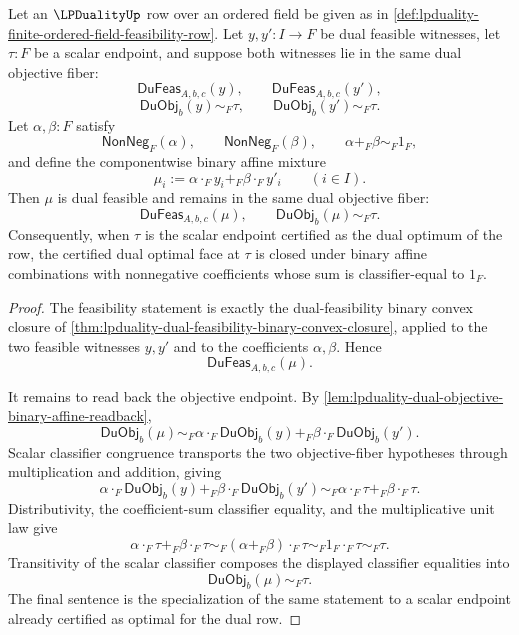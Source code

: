 \begin{theorem}
\label{thm:lpduality-optimal-dual-face-binary-convex-closure}
Let an $\LPDualityUp$ row over an ordered field be given as in \autoref{def:lpduality-finite-ordered-field-feasibility-row}. Let $y,y':I\to F$ be dual feasible witnesses, let $\tau:F$ be a scalar endpoint, and suppose both witnesses lie in the same dual objective fiber:
$$
\mathsf{DuFeas}_{A,b,c}(y),
\qquad
\mathsf{DuFeas}_{A,b,c}(y'),
$$
$$
\mathsf{DuObj}_{b}(y)\sim_F\tau,
\qquad
\mathsf{DuObj}_{b}(y')\sim_F\tau.
$$
Let $\alpha,\beta:F$ satisfy
$$
\mathsf{NonNeg}_F(\alpha),
\qquad
\mathsf{NonNeg}_F(\beta),
\qquad
\alpha+_F\beta\sim_F1_F,
$$
and define the componentwise binary affine mixture
$$
\mu_i:=\alpha\cdot_F y_i+_F\beta\cdot_F y'_i
\qquad (i\in I).
$$
Then $\mu$ is dual feasible and remains in the same dual objective fiber:
$$
\mathsf{DuFeas}_{A,b,c}(\mu),
\qquad
\mathsf{DuObj}_{b}(\mu)\sim_F\tau.
$$
Consequently, when $\tau$ is the scalar endpoint certified as the dual optimum of the row, the certified dual optimal face at $\tau$ is closed under binary affine combinations with nonnegative coefficients whose sum is classifier-equal to $1_F$.
\end{theorem}
\begin{proof}
The feasibility statement is exactly the dual-feasibility binary convex closure of \autoref{thm:lpduality-dual-feasibility-binary-convex-closure}, applied to the two feasible witnesses $y,y'$ and to the coefficients $\alpha,\beta$. Hence
$$
\mathsf{DuFeas}_{A,b,c}(\mu).
$$

It remains to read back the objective endpoint. By \autoref{lem:lpduality-dual-objective-binary-affine-readback},
$$
\mathsf{DuObj}_{b}(\mu)
\sim_F
\alpha\cdot_F\mathsf{DuObj}_{b}(y)+_F
\beta\cdot_F\mathsf{DuObj}_{b}(y').
$$
Scalar classifier congruence transports the two objective-fiber hypotheses through multiplication and addition, giving
$$
\alpha\cdot_F\mathsf{DuObj}_{b}(y)+_F
\beta\cdot_F\mathsf{DuObj}_{b}(y')
\sim_F
\alpha\cdot_F\tau+_F\beta\cdot_F\tau.
$$
Distributivity, the coefficient-sum classifier equality, and the multiplicative unit law give
$$
\alpha\cdot_F\tau+_F\beta\cdot_F\tau
\sim_F
(\alpha+_F\beta)\cdot_F\tau
\sim_F
1_F\cdot_F\tau
\sim_F
\tau.
$$
Transitivity of the scalar classifier composes the displayed classifier equalities into
$$
\mathsf{DuObj}_{b}(\mu)\sim_F\tau.
$$
The final sentence is the specialization of the same statement to a scalar endpoint already certified as optimal for the dual row.
\end{proof}

